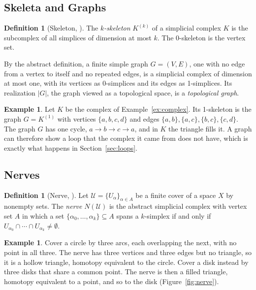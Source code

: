 \documentclass[11pt]{article}
\theoremstyle{definition}
\newtheorem{definition}[theorem]{Definition}
\newtheorem{example}[theorem]{Example}
\theoremstyle{remark}
\begin{document}
\subsection{Skeleta and Graphs}
\begin{definition}[Skeleton, {\cite{edelsbrunnerharerpatel2008}}]
The \emph{$k$-skeleton} $K^{(k)}$ of a simplicial complex $K$ is the subcomplex of all simplices of dimension at most $k$. The 0-skeleton is the vertex set.
\end{definition}
By the abstract definition, a finite simple graph $G = (V, E)$, one with no edge from a vertex to itself and no repeated edges, is a simplicial complex of dimension at most one, with its vertices as 0-simplices and its edges as 1-simplices.
Its realization $|G|$, the graph viewed as a topological space, is a \emph{topological graph}.

\begin{example}\label{ex:graph}
Let $K$ be the complex of Example~\ref{ex:complex}. Its 1-skeleton is the graph $G = K^{(1)}$ with vertices $\{a,b,c,d\}$ and edges $\{a,b\}, \{a,c\}, \{b,c\}, \{c,d\}$.
The graph $G$ has one cycle, $a \to b \to c \to a$, and in $K$ the triangle fills it.
A graph can therefore show a loop that the complex it came from does not have, which is exactly what happens in Section~\ref{sec:loops}.
\end{example}

\subsection{Nerves}
\begin{definition}[Nerve, {\cite{singh2007mapper,hatcher2001}}]
Let $\mathcal U = \{U_\alpha\}_{\alpha \in A}$ be a finite cover of a space $X$ by nonempty sets.
The \emph{nerve} $N(\mathcal U)$ is the abstract simplicial complex with vertex set $A$ in which a set $\{\alpha_0, \dots, \alpha_k\} \subseteq A$ spans a $k$-simplex if and only if $U_{\alpha_0} \cap \cdots \cap U_{\alpha_k} \neq \emptyset$.
\end{definition}

\begin{example}\label{ex:nerve}
Cover a circle by three arcs, each overlapping the next, with no point in all three.
The nerve has three vertices and three edges but no triangle, so it is a hollow triangle, homotopy equivalent to the circle.
Cover a disk instead by three disks that share a common point. The nerve is then a filled triangle, homotopy equivalent to a point, and so to the disk (Figure~\ref{fig:nerve}).
\end{example}
\end{document}
